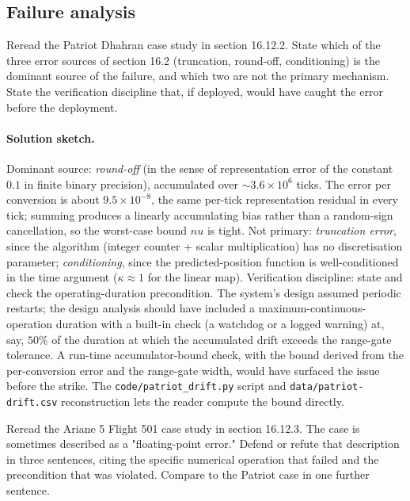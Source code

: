 \subsection*{Failure analysis}

\begin{exercise}
Reread the Patriot Dhahran case study in section 16.12.2. State
which of the three error sources of section 16.2 (truncation,
round-off, conditioning) is the dominant source of the failure,
and which two are not the primary mechanism. State the
verification discipline that, if deployed, would have caught the
error before the deployment.
\end{exercise}

\paragraph{Solution sketch.}
Dominant source: \emph{round-off} (in the sense of representation
error of the constant $0.1$ in finite binary precision), accumulated
over $\sim 3.6 \times 10^{6}$ ticks. The error per conversion is
about $9.5 \times 10^{-8}$, the same per-tick representation residual
in every tick; summing produces a linearly accumulating bias rather
than a random-sign cancellation, so the worst-case bound $nu$ is
tight. Not primary: \emph{truncation error}, since the algorithm
(integer counter + scalar multiplication) has no discretisation
parameter; \emph{conditioning}, since the predicted-position
function is well-conditioned in the time argument
($\kappa \approx 1$ for the linear map). Verification discipline:
state and check the operating-duration precondition. The system's
design assumed periodic restarts; the design analysis should have
included a maximum-continuous-operation duration with a built-in
check (a watchdog or a logged warning) at, say, $50 \%$ of the
duration at which the accumulated drift exceeds the range-gate
tolerance. A run-time accumulator-bound check, with the bound
derived from the per-conversion error and the range-gate width,
would have surfaced the issue before the strike. The
\texttt{code/patriot\_drift.py} script and
\texttt{data/patriot-drift.csv} reconstruction lets the reader
compute the bound directly.

\begin{exercise}
Reread the Ariane 5 Flight 501 case study in section 16.12.3. The
case is sometimes described as a "floating-point error." Defend
or refute that description in three sentences, citing the
specific numerical operation that failed and the precondition
that was violated. Compare to the Patriot case in one further
sentence.
\end{exercise}

